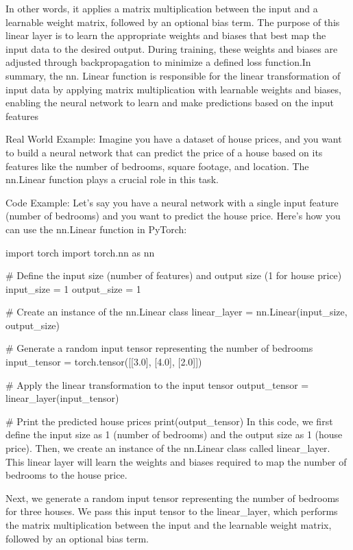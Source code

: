 In other words, it applies a matrix multiplication between the input and a learnable weight matrix, followed by an optional bias term.
The purpose of this linear layer is to learn the appropriate weights and biases that best map the input data to the desired output. 
During training, these weights and biases are adjusted through backpropagation to minimize a defined loss function.In summary, the nn.
Linear function is responsible for the linear transformation of input data
 by applying matrix multiplication with learnable weights and biases, enabling the neural 
 network to learn and make predictions based on the input features
 
 
 Real World Example:
 Imagine you have a dataset of house prices, and you want to build a neural network that can predict the price of a house based on its features like the number of bedrooms, square footage, and location. The nn.Linear function plays a crucial role in this task.
 
 Code Example:
 Let's say you have a neural network with a single input feature (number of bedrooms) and you want to predict the house price. Here's how you can use the nn.Linear function in PyTorch:
 
 import torch
 import torch.nn as nn
 
 # Define the input size (number of features) and output size (1 for house price)
 input_size = 1
 output_size = 1
 
 # Create an instance of the nn.Linear class
 linear_layer = nn.Linear(input_size, output_size)
 
 # Generate a random input tensor representing the number of bedrooms
 input_tensor = torch.tensor([[3.0], [4.0], [2.0]])
 
 # Apply the linear transformation to the input tensor
 output_tensor = linear_layer(input_tensor)
 
 # Print the predicted house prices
 print(output_tensor)
 In this code, we first define the input size as 1 (number of bedrooms) and the output size as 1 (house price). Then, we create an instance of the nn.Linear class called linear_layer. This linear layer will learn the weights and biases required to map the number of bedrooms to the house price.
 
 Next, we generate a random input tensor representing the number of bedrooms for three houses. We pass this input tensor to the linear_layer, which performs the matrix multiplication between the input and the learnable weight matrix, followed by an optional bias term.
 
